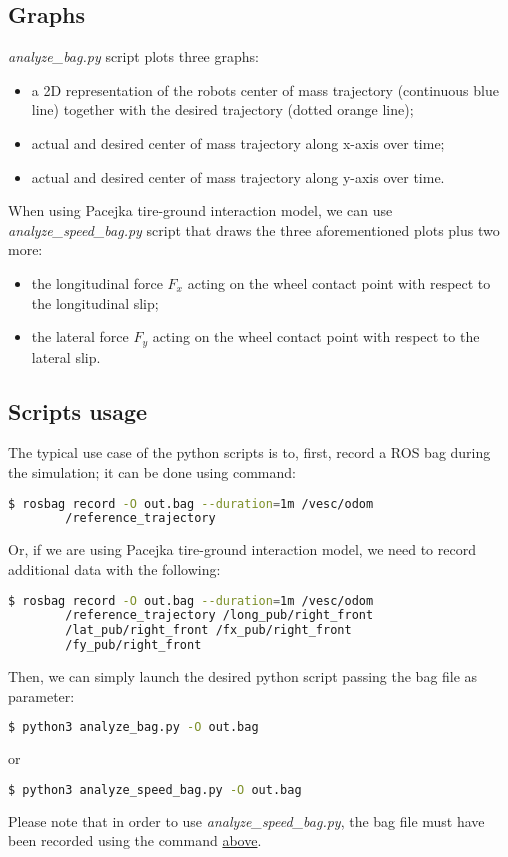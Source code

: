\subsection{Graphs}
\textit{analyze\_bag.py} script plots three graphs:
\begin{itemize}
    \item  a 2D representation of the robots center of mass trajectory (continuous blue line) together with the 
    desired trajectory (dotted orange line);
    \item actual and desired center of mass trajectory along x-axis over time;
    \item actual and desired center of mass trajectory along y-axis over time.
\end{itemize}
When using Pacejka tire-ground interaction model, we can use \textit{analyze\_speed\_bag.py} script that draws the three
aforementioned plots plus two more:
\begin{itemize}
    \item the longitudinal force $F_x$ acting on the wheel contact point with respect to the longitudinal slip;
    \item the lateral force $F_y$ acting on the wheel contact point with respect to the lateral slip.
\end{itemize}

\subsection{Scripts usage}
The typical use case of the python scripts is to, first, record a ROS bag during the simulation; it can be done using command:
\begin{lstlisting}[language=bash]
    $ rosbag record -O out.bag --duration=1m /vesc/odom
        /reference_trajectory
\end{lstlisting}
Or, if we are using Pacejka tire-ground interaction model, we need to record additional data with the following:
\begin{lstlisting}[language=bash,  label={pacejka}]
    $ rosbag record -O out.bag --duration=1m /vesc/odom 
        /reference_trajectory /long_pub/right_front 
        /lat_pub/right_front /fx_pub/right_front
        /fy_pub/right_front
\end{lstlisting}
Then, we can simply launch the desired python script passing the bag file as parameter:
\begin{lstlisting}[language=bash]
    $ python3 analyze_bag.py -O out.bag
\end{lstlisting}
or 
\begin{lstlisting}[language=bash]
    $ python3 analyze_speed_bag.py -O out.bag
\end{lstlisting}
Please note that in order to use \textit{analyze\_speed\_bag.py}, the bag file must have been recorded using the command
\hyperref[pacejka]{above}.